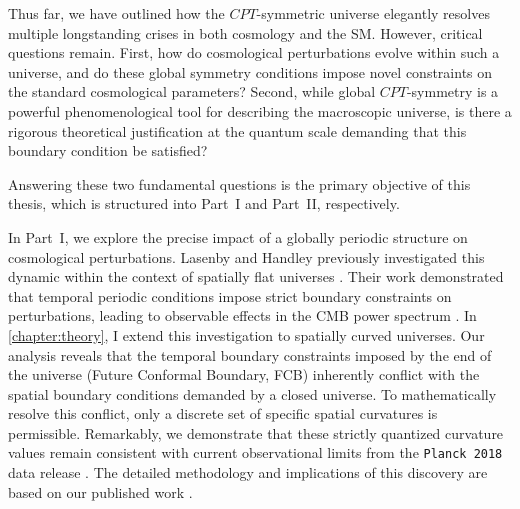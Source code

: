 \documentclass[12pt,a4paper]{report}
\let\cite\parencite
\begin{document}
Thus far, we have outlined how the $CPT$-symmetric universe elegantly resolves multiple longstanding crises in both cosmology and the SM. However, critical questions remain. First, how do cosmological perturbations evolve within such a universe, and do these global symmetry conditions impose novel constraints on the standard cosmological parameters? Second, while global $CPT$-symmetry is a powerful phenomenological tool for describing the macroscopic universe, is there a rigorous theoretical justification at the quantum scale demanding that this boundary condition be satisfied?

Answering these two fundamental questions is the primary objective of this thesis, which is structured into Part~I and Part~II, respectively.

In Part~I, we explore the precise impact of a globally periodic structure on cosmological perturbations. Lasenby and Handley previously investigated this dynamic within the context of spatially flat universes \cite{Lasenby_2022}. Their work demonstrated that temporal periodic conditions impose strict boundary constraints on perturbations, leading to observable effects in the CMB power spectrum \cite{Bartlett_2022,Prathaban_2022}. In \cref{chapter:theory}, I extend this investigation to spatially curved universes. Our analysis reveals that the temporal boundary constraints imposed by the end of the universe (Future Conformal Boundary, FCB) inherently conflict with the spatial boundary conditions demanded by a closed universe. To mathematically resolve this conflict, only a discrete set of specific spatial curvatures is permissible. Remarkably, we demonstrate that these strictly quantized curvature values remain consistent with current observational limits from the \texttt{Planck 2018} data release \cite{Planck2018}. The detailed methodology and implications of this discovery are based on our published work \cite{PhysRevD.110.103528}.
\end{document}
